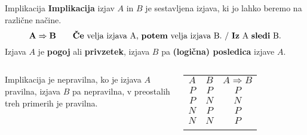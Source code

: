         \begin{frame}
            \begin{alertblock}{Implikacija}
                \textbf{Implikacija} izjav $A$ in $B$ je sestavljena izjava, ki jo lahko beremo
                na različne načine.
                $$ \mathbf{A\Rightarrow B} \quad \quad \textmd{\textbf{Če} velja izjava A, 
                \textbf{potem} velja izjava B. / \textbf{Iz} A \textbf{sledi} B.}$$
                Izjava $A$ je \textbf{pogoj} ali \textbf{privzetek}, izjava $B$ pa 
                \textbf{(logična) posledica} izjave $A$.
            \end{alertblock}
            \begin{columns}
                    \begin{alertblock}{}
                        Implikacija je nepravilna, ko je izjava $A$ pravilna, izjava $B$ pa 
                        nepravilna, v preostalih treh primerih je pravilna.
                    \end{alertblock}

                    \begin{table}
                        \centering
                        \begin{tabular}{||c|c|c||} 
                        \hhline{|t:===:t|}
                        \rowcolor[rgb]{0.843,0.718,0.718} $A$ & $B$ & $A\Rightarrow B$  \\ 
                        \hhline{|:===:|}
                        $P$ & $P$ & $P$                         \\ 
                        \hline
                        $P$ & $N$ & $N$                         \\ 
                        \hline
                        $N$ & $P$ & $P$                         \\ 
                        \hline
                        $N$ & $N$ & $P$                         \\
                        \hhline{|b:===:b|}
                        \end{tabular}
                    \end{table}

            \end{columns}
        \end{frame}

